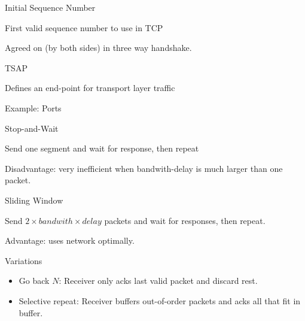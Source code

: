 \documentclass[main.tex]{subfiles}
\begin{document}
\begin{card}[ISN]{Initial Sequence Number}
\item First valid sequence number to use in TCP
\item Agreed on (by both sides) in three way handshake.
\end{card}

\begin{card}{TSAP}
\item Defines an end-point for transport layer traffic
\item Example: Ports
\end{card}

\begin{card}{Stop-and-Wait}
\item Send one segment and wait for response, then repeat
\item Disadvantage: very inefficient when bandwith-delay is much larger than one packet.
\end{card}

\begin{card}{Sliding Window}
\item Send $2\times bandwith \times delay$ packets and wait for responses, then repeat.
\item Advantage: uses network optimally.
\item Variations
    \begin{itemize}
        \item Go back $N$: Receiver only acks last valid packet and discard rest.
        \item Selective repeat: Receiver buffers out-of-order packets and acks all that fit in buffer.
    \end{itemize}
\end{card}
\end{document}
